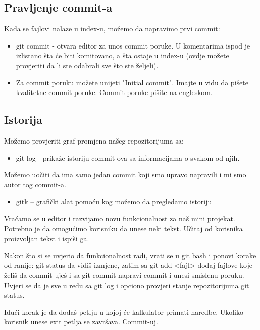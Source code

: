 \documentclass[11pt,a4paper]{article}
\begin{document}
\subsection{Pravljenje commit-a}

Kada se fajlovi nalaze u index-u, možemo da napravimo prvi commit:

\begin{itemize}
\item
  git commit - otvara editor za unos commit poruke. U komentarima ispod
  je izlistano šta će biti komitovano, a šta ostaje u index-u (ovdje
  možete provjeriti da li ste odabrali sve što ste željeli).
\item
  Za commit poruku možete unijeti "Initial commit". Imajte u vidu da
  pišete \href{https://chris.beams.io/posts/git-commit/}{kvalitetne
  commit poruke}. Commit poruke pišite na engleskom.
\end{itemize}

\subsection{Istorija}

Možemo provjeriti graf promjena našeg repozitorijuma sa:

\begin{itemize}
\item
  git log - prikaže istoriju commit-ova sa informacijama o svakom od
  njih.
\end{itemize}

Možemo uočiti da ima samo jedan commit koji smo upravo napravili i mi
smo autor tog commit-a.

\begin{itemize}
\item
  gitk -- grafički alat pomoću kog možemo da pregledamo istoriju
\end{itemize}

Vraćamo se u editor i razvijamo novu funkcionalnost za naš mini
projekat. Potrebno je da omogućimo korisniku da unese neki tekst. Učitaj
od korisnika proizvoljan tekst i ispiši ga.

Nakon što si se uvjerio da funkcionalnost radi, vrati se u git bash i
ponovi korake od ranije: git status da vidiš izmjene, zatim sa git add
\textless fajl\textgreater{} dodaj fajlove koje želiš da commit-uješ i
sa git commit napravi commit i unesi smislenu poruku. Uvjeri se da je
sve u redu sa git log i opciono provjeri stanje repozitorijuma git
status.

Idući korak je da dodaš petlju u kojoj će kalkulator primati naredbe.
Ukoliko korisnik unese exit petlja se završava. Commit-uj.
\end{document}

